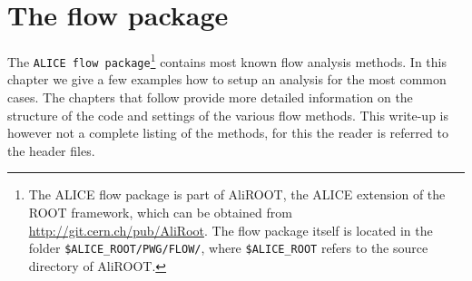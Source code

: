\documentclass[a5paper]{book}
\numberwithin{equation}{subsection}
\begin{document}
\section{The flow package}
\label{quickstart}
The \texttt{ALICE flow package}\footnote{The ALICE flow package is part of AliROOT, the ALICE extension of the ROOT framework, which can be obtained from \href{http://git.cern.ch/pub/AliRoot}{http://git.cern.ch/pub/AliRoot}. The flow package itself is located in the folder \texttt{\$ALICE\_ROOT/PWG/FLOW/}, where \texttt{\$ALICE\_ROOT} refers to the source directory of AliROOT.} 
contains most known flow analysis methods.  In this chapter we give a few examples how to setup an
analysis for the most common cases. The chapters that follow provide more detailed information on the structure of the code 
and settings of the various flow methods. 
This write-up is however not a complete listing of the methods, for this the reader is referred to the header files.
 
\end{document}
